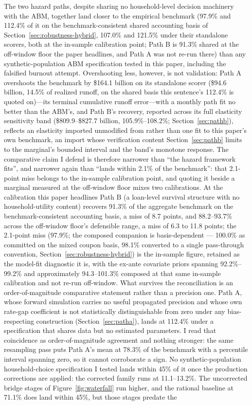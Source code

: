 \documentclass[12pt]{article}
\begin{document}
The two hazard paths, despite sharing no household-level decision machinery with the ABM, together land closer to the empirical benchmark (97.9\% and 112.4\% of it on the benchmark-consistent shared accounting basis of Section~\ref{sec:robustness-hybrid}, 107.0\% and 121.5\% under their standalone scorers, both at the in-sample calibration point; Path B is 91.3\% shared at the off-window floor the paper headlines, and Path A was not re-run there) than any synthetic-population ABM specification tested in this paper, including the falsified burnout attempt. Overshooting less, however, is not validation: Path A overshoots the benchmark by \$164.1 billion on its standalone scorer (\$94.6 billion, 14.5\% of realized runoff, on the shared basis this sentence's 112.4\% is quoted on)---its terminal cumulative runoff error---with a monthly path fit no better than the ABM's, and Path B's recovery, reported across its full elasticity sensitivity band (\$809.9--\$827.7 billion, 105.9\%--108.2\%; Section~\ref{sec:pathb}), reflects an elasticity imported unmodified from \citet{liebersohn2024} rather than one fit to this paper's own benchmark, an import whose verification content Section~\ref{sec:pathb} limits to the marginal's bounded interval and the band's monotone response. The comparative claim I defend is therefore narrower than ``the hazard framework fits'', and narrower again than ``lands within 2.1\% of the benchmark'': that 2.1-point miss belongs to the in-sample calibration point, and quoting it beside a marginal measured at the off-window floor mixes two calibrations. At the calibration this paper headlines Path B (a loan-level survival structure with no household-utility content) recovers 91.3\% of the aggregate benchmark on the benchmark-consistent accounting basis, a miss of 8.7 points, and 88.2--93.7\% across the off-window floor's defensible range, a miss of 6.3 to 11.8 points; the 2.1-point miss (97.9\%; the composed companion is basis-dependent --- 100.0\% as committed on the mixed coupon basis, 98.1\% converted to a single pass-through convention, Section~\ref{sec:robustness-hybrid}) is the in-sample figure, retained as the model-fit diagnostic it is, with the ex-ante covariate priors spanning 92.2\%--99.2\% and approximately 94.3--101.3\% composed at that same in-sample calibration and not re-run off-window. What survives the reconciliation is an order-of-magnitude comparative statement rather than a precision one. Path A, whose forward simulation carries no useful propagated precision and whose own rate-gap coefficient is not statistically distinguishable from zero under any bias-respecting construction (Section~\ref{sec:patha}), lands at 112.4\% under a specification that shares data but no estimated parameters. I read that coincidence as order-of-magnitude agreement and nothing stronger: the same resampling pass puts Path A's mean at 78.3\% of the benchmark with a percentile interval spanning zero, so it cannot corroborate a sign. No synthetic-population household-choice specification I tested lands within 45\% of it once the production corrections are applied: the corrected family runs at 11.1--13.2\%. The uncorrected bridge stages of Figure~\ref{fig:waterfall} run higher, and the rational baseline at 71.1\% does land within 45\%, but those stages predate the 
\end{document}
